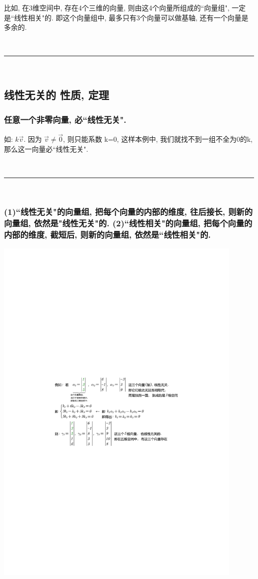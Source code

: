 \documentclass[UTF8]{ctexart}
\begin{document}
比如, 在3维空间中, 存在4个三维的向量, 则由这4个向量所组成的``向量组", 一定是``线性相关"的. 即这个向量组中, 最多只有3个向量可以做基轴, 还有一个向量是多余的.



~\\
\hrule
~\\

\subsection{线性无关的 性质, 定理}


\subsubsection{任意一个非零向量, 必``线性无关".}

如: $k\vec{v}$. 因为 $\vec{v} \ne \vec{0}$, 则只能系数 k=0, 这样本例中, 我们就找不到一组不全为0的k, 那么这一向量必``线性无关".

~\\
\hrule
~\\

\subsubsection{(1)``线性无关"的向量组, 把每个向量的内部的维度, 往后接长, 则新的向量组, 依然是"线性无关"的. (2)``线性相关"的向量组, 把每个向量的内部的维度, 截短后, 则新的向量组, 依然是``线性相关"的.}


\begin{myEnvSample}
	\includegraphics[width=0.9\textwidth]{img/0109.pdf}
\end{myEnvSample}
\end{document}
